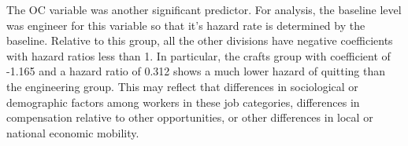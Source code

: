 \documentclass[12pt,letterpaper]{article}
\begin{document}
The OC variable was another significant predictor. For analysis, the baseline level was engineer for this variable so that it's hazard rate is determined by the baseline. Relative to this group, all the other divisions have negative coefficients with hazard ratios less than 1. In particular, the crafts group with coefficient of -1.165 and a hazard ratio of 0.312 shows a much lower hazard of quitting than the engineering group. This may reflect that differences in sociological or demographic factors among workers in these job categories, differences in compensation relative to other opportunities, or other differences in local or national economic mobility.
\end{document}
